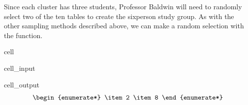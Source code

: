 \documentclass[letterpaper,10pt,english]{jupyterBook}
\begin{document}
\sphinxAtStartPar
Since each cluster has three students, Professor Baldwin will need to randomly select two of the ten tables to create the six\sphinxhyphen{}person study group. As with the other sampling methods described above, we can make a random selection with the  function.

\begin{sphinxuseclass}{cell}\begin{sphinxVerbatimInput}

\begin{sphinxuseclass}{cell_input}
\begin{sphinxVerbatim}[commandchars=\\\{\}]
\end{sphinxVerbatim}

\end{sphinxuseclass}\end{sphinxVerbatimInput}
\begin{sphinxVerbatimOutput}

\begin{sphinxuseclass}{cell_output}\begin{equation*}
\begin{split}\begin{enumerate*}
\item 2
\item 8
\end{enumerate*}\end{split}
\end{equation*}
\end{sphinxuseclass}\end{sphinxVerbatimOutput}

\end{sphinxuseclass}
\end{document}
